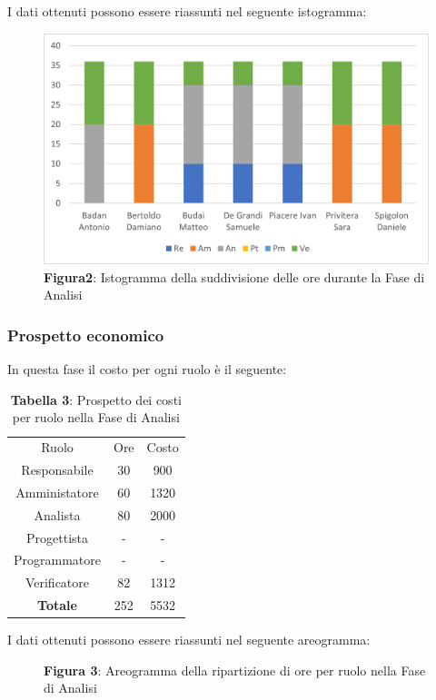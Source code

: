 I dati ottenuti possono essere riassunti nel seguente istogramma:
\begin{figure}[H]
	\centering
	\includegraphics[width=0.7\linewidth]{res/images/Figura2.png}
	\caption*{\textbf{Figura2}: Istogramma della suddivisione delle ore durante la Fase di Analisi}
	\label{fig:Figura2}
\end{figure}

\subsubsection{Prospetto economico}
In questa fase il costo per ogni ruolo è il seguente:

\begin{table}[H]
	\centering
	\renewcommand{\arraystretch}{1.5}
	\begin{tabular}{|c|c|c|}
		\hline
		\rowcolor{lighter-grayer}
		Ruolo & Ore & Costo\\
Responsabile  & 30  & 900  \\ \hline
Amministatore & 60  & 1320 \\ \hline
Analista      & 80  & 2000 \\ \hline
Progettista   & - & - \\ \hline
Programmatore & - & - \\ \hline
Verificatore  & 82  & 1312 \\ \hline
\textbf{Totale}& 252 & 5532 \\ \hline
\end{tabular}
	\caption*{\textbf{Tabella 3}: Prospetto dei costi per ruolo nella Fase di Analisi\\}
\end{table}
I dati ottenuti possono essere riassunti nel seguente areogramma:
\begin{figure}[H]
	\centering
	\caption*{\textbf{Figura 3}:  Areogramma della ripartizione di ore per ruolo nella Fase di Analisi}
	\label{fig:Figura3}
\end{figure}	



